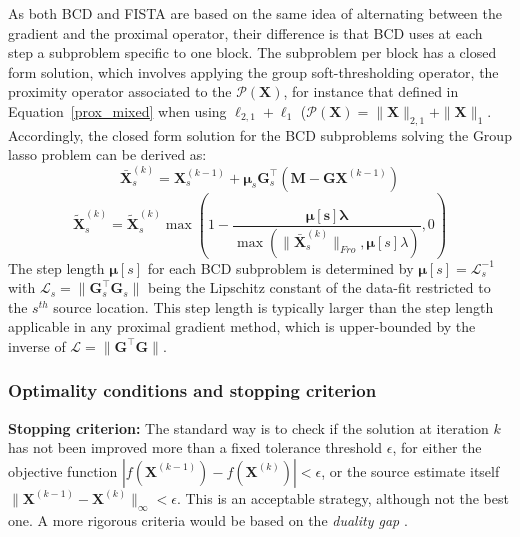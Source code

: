 As both BCD and FISTA are based on the same idea of alternating between the gradient and the proximal operator, their difference is that BCD uses at each step a subproblem specific to one block. The subproblem per block has a closed form solution, which involves applying the group soft-thresholding operator, the proximity operator associated to the $\mathcal{P}(\mathbf{X})$, for instance that defined in Equation~\ref{prox_mixed} when using $\ell_{2,1}+\ell_1$ ($\mathcal{P}(\mathbf{X}) = \|\mathbf{X}\|_{2,1}+\|\mathbf{X}\|_1$. Accordingly, the closed form solution for the BCD subproblems solving the Group \ac{lasso} problem can be derived as:
\begin{equation*} \label{eq_bcd_glasso}
\bar{\mathbf{X}}_s^{(k)} = \mathbf{X}_s^{(k-1)}+\mathbf{\mu}_s\mathbf{G}^\top_s(\mathbf{M} - \mathbf{GX}^{(k-1)})
\end{equation*}
\begin{equation}
\tilde{\mathbf{X}}_s^{(k)} = \tilde{\mathbf{X}}_s^{(k)}\max(1-\frac{\mathbf{\mu[s]\lambda}}{\max(\|\bar{\mathbf{X}}_s^{(k)}\|_{Fro}, \mathbf{\mu}[s]\lambda)}, 0)
\end{equation}
The step length $\mathbf{\mu}[s]$ for each BCD subproblem is determined by $\mathbf{\mu}[s]=\mathcal{L}_s^{-1}$ with $\mathcal{L}_s=\|\mathbf{G}_s^\top\mathbf{G}_s\|$ being the Lipschitz constant of the data-fit restricted to the $s^{th}$ source location. This step length is typically larger than the step length applicable in any proximal gradient method, which is upper-bounded by the inverse of $\mathcal{L} = \|\mathbf{G}^\top\mathbf{G}\|$.

\subsubsection*{Optimality conditions and stopping criterion}\label{section:duality_gap}

\textbf{Stopping criterion:} The standard way is to check if the solution at iteration $k$ has not been improved more than a fixed tolerance threshold $\epsilon$, for either the objective function $|f(\mathbf{X}^{(k-1)})-f(\mathbf{X}^{(k)})|<\epsilon$, or the source estimate itself $\|\mathbf{X}^{(k-1)}-\mathbf{X}^{(k)}\|_{\infty}<\epsilon$. This is an acceptable strategy, although not the best one. A more rigorous criteria would be based on the \textit{duality gap} \cite{Boyd_Vandenberghe04,bach2012optimization}.\\

